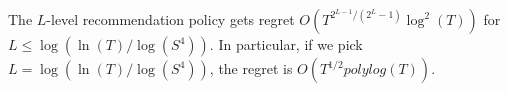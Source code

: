 \begin{comment}
   
   \draw[dashed] (0+0.4,6)--(6.4,7.5);  	
   \draw[dashed] (3+0.4,6)--(6.4,7.5);  	
  \node at (6,1.5)[rotate = 90]{$\cdots$};
  \node at (-1,1.5)[rotate = 90]{$\cdots$};
  \node at (6,9.5)[rotate = 90]{$\cdots$};
  \node at (-1,9.5)[rotate = 90]{$\cdots$};
  \node at(-1.2,0.5){\textbf{Level 1}};
  \node at(-1.2,3){\textbf{Level $l-2$}};
  \node at(-1.2,5.5){\textbf{Level $l-1$}};
  \node at(-1.2,8){\textbf{Level $l$}};
  \node at(-1.2,10.5){\textbf{Level $L$}};
  \draw[->] (13.3,0)--(13.3,12);
  \node at(13.7,6)[ rotate=90]{Time};
  \draw [rounded corners=5mm, line width=1mm, red](-0.2,1.75)--(12,1.75)--(12,9)--(-0.2,9)--cycle;\draw [rounded corners=2.5mm, line width=0.5mm, brown](5.9,6.5)--(8.9,6.5)--(8.9,8.8)--(5.9,8.8)--cycle;
\end{tikzpicture}
\caption{$l$-level Recommendation Policy.}
\label{fig:llevel}
\end{figure}
\end{comment}

\begin{theorem}
\label{thm:llevel}
The $L$-level recommendation policy gets regret $O\left(T^{2^{L-1}/(2^L-1)} \log^2(T) \right)$ for $L \leq \log(\ln(T)/\log(S^4))$. In particular, if we pick $L = \log(\ln(T)/\log(S^4))$, the regret is $O(T^{1/2} polylog(T))$. 
\end{theorem}

